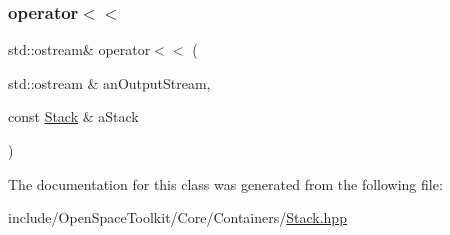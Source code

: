 \subsubsection{\texorpdfstring{operator$<$$<$}{operator<<}}
{\footnotesize\ttfamily std\+::ostream\& operator$<$$<$ (\begin{DoxyParamCaption}\item[{std\+::ostream \&}]{an\+Output\+Stream,  }\item[{const \hyperlink{classostk_1_1core_1_1ctnr_1_1_stack}{Stack} \&}]{a\+Stack }\end{DoxyParamCaption})\hspace{0.3cm}{\ttfamily [friend]}}



The documentation for this class was generated from the following file\+:\begin{DoxyCompactItemize}
\item 
include/\+Open\+Space\+Toolkit/\+Core/\+Containers/\hyperlink{_stack_8hpp}{Stack.\+hpp}\end{DoxyCompactItemize}
